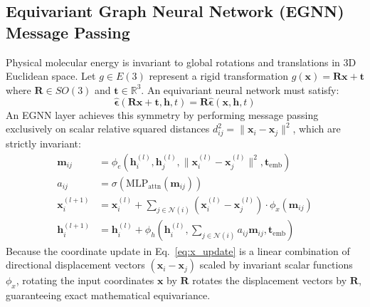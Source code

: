 \documentclass[12pt, a4paper]{article}
\begin{document}
\subsection{Equivariant Graph Neural Network (EGNN) Message Passing}
Physical molecular energy is invariant to global rotations and translations in 3D Euclidean space. Let $g \in E(3)$ represent a rigid transformation $g(\mathbf{x}) = \mathbf{R}\mathbf{x} + \mathbf{t}$ where $\mathbf{R} \in SO(3)$ and $\mathbf{t} \in \mathbb{R}^3$. An equivariant neural network must satisfy:
\begin{equation}
    \hat{\boldsymbol{\epsilon}}(\mathbf{R}\mathbf{x} + \mathbf{t}, \mathbf{h}, t) = \mathbf{R} \hat{\boldsymbol{\epsilon}}(\mathbf{x}, \mathbf{h}, t)
\end{equation}
An EGNN layer \cite{satorras2021en} achieves this symmetry by performing message passing exclusively on scalar relative squared distances $d_{ij}^2 = \|\mathbf{x}_i - \mathbf{x}_j\|^2$, which are strictly invariant:
\begin{align}
    \mathbf{m}_{ij} &= \phi_e\!\left(\mathbf{h}_i^{(l)}, \mathbf{h}_j^{(l)}, \|\mathbf{x}_i^{(l)} - \mathbf{x}_j^{(l)}\|^2, \mathbf{t}_\text{emb}\right) \label{eq:msg} \\
    a_{ij} &= \sigma\!\left(\text{MLP}_\text{attn}(\mathbf{m}_{ij})\right) \label{eq:attn} \\
    \mathbf{x}_i^{(l+1)} &= \mathbf{x}_i^{(l)} + \sum_{j \in \mathcal{N}(i)} (\mathbf{x}_i^{(l)} - \mathbf{x}_j^{(l)}) \cdot \phi_x(\mathbf{m}_{ij}) \label{eq:x_update} \\
    \mathbf{h}_i^{(l+1)} &= \mathbf{h}_i^{(l)} + \phi_h\!\left(\mathbf{h}_i^{(l)}, \sum_{j \in \mathcal{N}(i)} a_{ij} \mathbf{m}_{ij}, \mathbf{t}_\text{emb}\right) \label{eq:h_update}
\end{align}
Because the coordinate update in Eq.~\eqref{eq:x_update} is a linear combination of directional displacement vectors $(\mathbf{x}_i - \mathbf{x}_j)$ scaled by invariant scalar functions $\phi_x$, rotating the input coordinates $\mathbf{x}$ by $\mathbf{R}$ rotates the displacement vectors by $\mathbf{R}$, guaranteeing exact mathematical equivariance.
\end{document}
